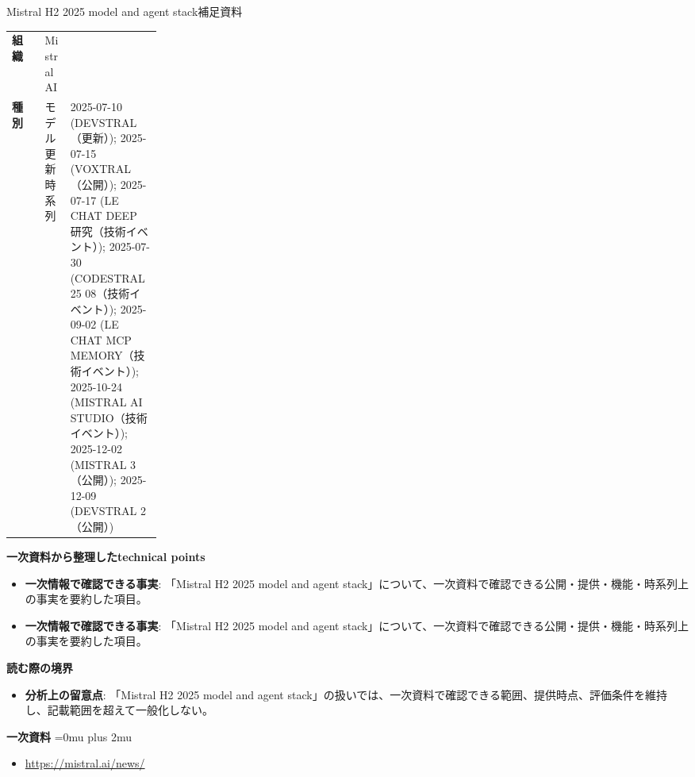 \begin{technicalnote}{Mistral H2 2025 model and agent stack}{補足資料}
\begingroup
\begin{tabularx}{\linewidth}{@{}>{\bfseries}p{0.22\linewidth}X@{}}
組織 & Mistral AI \\
種別 & モデル更新
時系列 & 2025-07-10 (DEVSTRAL（更新）); 2025-07-15 (VOXTRAL（公開）); 2025-07-17 (LE CHAT DEEP 研究（技術イベント）); 2025-07-30 (CODESTRAL 25 08（技術イベント）); 2025-09-02 (LE CHAT MCP MEMORY（技術イベント）); 2025-10-24 (MISTRAL AI STUDIO（技術イベント）); 2025-12-02 (MISTRAL 3（公開）); 2025-12-09 (DEVSTRAL 2（公開）) \\
\end{tabularx}
\smallskip
{\bfseries 一次資料から整理したtechnical points}
\begin{itemize}[leftmargin=1.5em,itemsep=0.35em]
\item \textbf{一次情報で確認できる事実}: 「Mistral H2 2025 model and agent stack」について、一次資料で確認できる公開・提供・機能・時系列上の事実を要約した項目。
\item \textbf{一次情報で確認できる事実}: 「Mistral H2 2025 model and agent stack」について、一次資料で確認できる公開・提供・機能・時系列上の事実を要約した項目。
\end{itemize}
\begin{minipage}{\linewidth}
{\bfseries 読む際の境界}
\begin{itemize}[leftmargin=1.5em,itemsep=0.35em]
\item \textbf{分析上の留意点}: 「Mistral H2 2025 model and agent stack」の扱いでは、一次資料で確認できる範囲、提供時点、評価条件を維持し、記載範囲を超えて一般化しない。
\end{itemize}
\begin{samepage}
{\bfseries 一次資料}
\begingroup\sloppy
\Urlmuskip=0mu plus 2mu\relax
\begin{itemize}[leftmargin=1.5em,itemsep=0.25em]
\item {\scriptsize\url{https://mistral.ai/news/}}
\end{itemize}
\endgroup
\end{samepage}
\end{minipage}
\endgroup
\end{technicalnote}
\medskip

